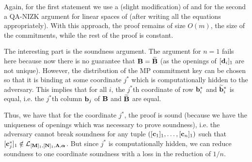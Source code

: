 Again, for the first statement we use a (slight modification) of \cite{AC:GonHevRaf15} and for the second
a QA-NIZK argument for linear spaces of \cite{C:JutRoy14,EC:KilWee15} (after writing all the equations appropriately). 
With this approach, the proof remains of size $O(m)$, the size of the commitments, while the rest of the proof is constant. 

The interesting part is the soundness argument. The argument for $n=1$ fails here because now there is no guarantee that 
 $\mathbf{{B}}=\widetilde{\mathbf{{B}}}$ (as the openings of $[\mathbf{d}_i]_1$ are not unique).  However, the distribution of the MP commitment key can be chosen so that it is binding at some coordinate $j^*$ which is computationally hidden to the adversary. This implies that for all $i$, the $j^*$th coordinate of row $\mathbf{b}_i^*$ and $\widetilde{\mathbf{b}}_i^*$ is equal, i.e. the $j^*$th column $\mathbf{b}_j$ of $\mathbf{{B}}$ and $\widetilde{\mathbf{{B}}}$ are equal.  

Thus, we have that for the coordinate $j^*$, the proof is sound (because we have the uniqueness of openings which was necessary to prove soundness), i.e. the adversary cannot break soundness for any tuple $([\mathbf{c}_1]_1,\ldots, [\mathbf{c}_n]_1)$ such that $[\mathbf{c}_j^*]_1 \notin \mathcal{L}_{[\mathbf{{M}}]_1,[\mathbf{{N}}]_1,\mathbf{{\Lambda}},{\boldsymbol \alpha}}$. 
But since $j^*$ is computationally hidden, we can reduce soundness to one coordinate soundness with a loss in the reduction of $1/n$. 

